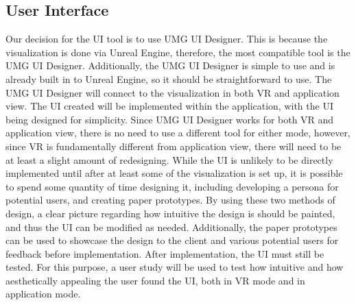 \documentclass[onecolumn, draftclsnofoot, 10pt, compsoc]{IEEEtran}
\begin{document}
\subsection{User Interface}
\begin{singlespace}
Our decision for the UI tool is to use UMG UI Designer. This is because the visualization is done via Unreal Engine, therefore, the most compatible tool is the UMG UI Designer. Additionally, the UMG UI Designer is simple to use and is already built in to Unreal Engine, so it should be straightforward to use.
\newline
\newline
The UMG UI Designer will connect to the visualization in both VR and application view. The UI created will be implemented within the application, with the UI being designed for simplicity. Since UMG UI Designer works for both VR and application view, there is no need to use a different tool for either mode, however, since VR is fundamentally different from application view, there will need to be at least a slight amount of redesigning.
\newline
\newline
While the UI is unlikely to be directly implemented until after at least some of the visualization is set up, it is possible to spend some quantity of time designing it, including developing a persona for potential users, and creating paper prototypes. By using these two methods of design, a clear picture regarding how intuitive the design is should be painted, and thus the UI can be modified as needed. Additionally, the paper prototypes can be used to showcase the design to the client and various potential users for feedback before implementation.
\newline
\newline
After implementation, the UI must still be tested. For this purpose, a user study will be used to test how intuitive and how aesthetically appealing the user found the UI, both in VR mode and in application mode.

\end{singlespace}
\end{document}
